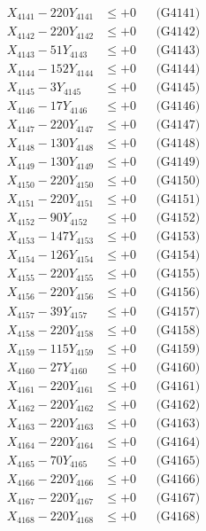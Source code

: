 \documentclass[a4paper,10pt]{article}
\begin{document}
{\begin{align}
\allowbreak
X_{4141} - 220Y_{4141} &\leq +0 && \text{(G4141)} \\
X_{4142} - 220Y_{4142} &\leq +0 && \text{(G4142)} \\
X_{4143} - 51Y_{4143} &\leq +0 && \text{(G4143)} \\
X_{4144} - 152Y_{4144} &\leq +0 && \text{(G4144)} \\
X_{4145} - 3Y_{4145} &\leq +0 && \text{(G4145)} \\
X_{4146} - 17Y_{4146} &\leq +0 && \text{(G4146)} \\
X_{4147} - 220Y_{4147} &\leq +0 && \text{(G4147)} \\
X_{4148} - 130Y_{4148} &\leq +0 && \text{(G4148)} \\
X_{4149} - 130Y_{4149} &\leq +0 && \text{(G4149)} \\
X_{4150} - 220Y_{4150} &\leq +0 && \text{(G4150)} \\
\allowbreak
X_{4151} - 220Y_{4151} &\leq +0 && \text{(G4151)} \\
X_{4152} - 90Y_{4152} &\leq +0 && \text{(G4152)} \\
X_{4153} - 147Y_{4153} &\leq +0 && \text{(G4153)} \\
X_{4154} - 126Y_{4154} &\leq +0 && \text{(G4154)} \\
X_{4155} - 220Y_{4155} &\leq +0 && \text{(G4155)} \\
X_{4156} - 220Y_{4156} &\leq +0 && \text{(G4156)} \\
X_{4157} - 39Y_{4157} &\leq +0 && \text{(G4157)} \\
X_{4158} - 220Y_{4158} &\leq +0 && \text{(G4158)} \\
X_{4159} - 115Y_{4159} &\leq +0 && \text{(G4159)} \\
X_{4160} - 27Y_{4160} &\leq +0 && \text{(G4160)} \\
\allowbreak
X_{4161} - 220Y_{4161} &\leq +0 && \text{(G4161)} \\
X_{4162} - 220Y_{4162} &\leq +0 && \text{(G4162)} \\
X_{4163} - 220Y_{4163} &\leq +0 && \text{(G4163)} \\
X_{4164} - 220Y_{4164} &\leq +0 && \text{(G4164)} \\
X_{4165} - 70Y_{4165} &\leq +0 && \text{(G4165)} \\
X_{4166} - 220Y_{4166} &\leq +0 && \text{(G4166)} \\
X_{4167} - 220Y_{4167} &\leq +0 && \text{(G4167)} \\
X_{4168} - 220Y_{4168} &\leq +0 && \text{(G4168)} \\

\end{align}}
\end{document}
